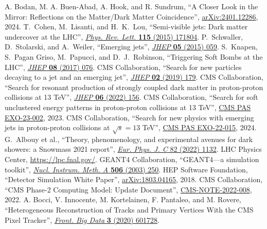 \begin{thebibliography}{99}
 A. Bodan, M. A. Buen-Abad, A. Hook, and R. Sundrum, ``A Closer Look in the Mirror: Reflections on the Matter/Dark Matter Coincidence'', \href{https://arxiv.org/abs/2401.12286}{arXiv:2401.12286}, 2024.
 T.~Cohen, M.~Lisanti, and H.~K.~Lou, ``Semi-visible jets: Dark matter undercover at the {LHC}'', \href{https://doi.org/10.1103/PhysRevLett.115.171804}{\textit{Phys. Rev. Lett.} \textbf{115} (2015) 171804}.
 P.~Schwaller, D.~Stolarski, and A.~Weiler, ``Emerging jets'', \href{http://dx.doi.org/10.1007/JHEP05(2015)059}{\textit{JHEP} \textbf{05} (2015) 059}.
 S.~Knapen, S.~Pagan Griso, M.~Papucci, and D.~J.~Robinson, ``Triggering Soft Bombs at the LHC'', \href{http://dx.doi.org/10.1007/JHEP08(2017)076}{\textit{JHEP} \textbf{08} (2017) 076}.
 CMS Collaboration, ``Search for new particles decaying to a jet and an emerging jet'', \href{https://doi.org/10.1007/JHEP02(2019)179}{\textit{JHEP} \textbf{02} (2019) 179}.
 CMS Collaboration, ``Search for resonant production of strongly coupled dark matter in proton-proton collisions at 13 TeV'', \href{https://doi.org/10.1007/JHEP06(2022)156}{\textit{JHEP} \textbf{06} (2022) 156}.
 CMS Collaboration, ``Search for soft unclustered energy patterns in proton-proton collisions at 13 TeV'', \href{http://cds.cern.ch/record/2883117}{CMS PAS EXO-23-002}, 2023.
 CMS Collaboration, ``Search for new physics with emerging jets in proton-proton collisions at $\sqrt{s}=13$ TeV'', \href{https://cds.cern.ch/record/2889672}{CMS PAS EXO-22-015}, 2024.
 G.~Albouy et al., ``Theory, phenomenology, and experimental avenues for dark showers: a Snowmass 2021 report'', \href{https://doi.org/10.1140/epjc/s10052-022-11048-8}{\textit{Eur. Phys. J. C} 82 (2022) 1132}.
 LHC Physics Center, \href{https://lpc.fnal.gov/}{https://lpc.fnal.gov/}.
 {GEANT4} Collaboration, ``{GEANT4}---a simulation toolkit'', \href{http://dx.doi.org/10.1016/S0168-9002(03)01368-8}{\textit{Nucl. Instrum. Meth. A} \textbf{506} (2003) 250}.
 HEP Software Foundation, ``Detector Simulation White Paper'', \href{https://arxiv.org/abs/1803.04165}{arXiv:1803.04165}, 2018.
 CMS Collaboration, ``CMS Phase-2 Computing Model: Update Document'', \href{https://cds.cern.ch/record/2815292}{CMS-NOTE-2022-008}, 2022.
 A. Bocci, V. Innocente, M. Kortelainen, F. Pantaleo, and M. Rovere, ``Heterogeneous Reconstruction of Tracks and Primary Vertices With the CMS Pixel Tracker'', \href{https://doi.org/10.3389/fdata.2020.601728}{\textit{Front. Big Data} \textbf{3} (2020) 601728}.

\end{thebibliography}
